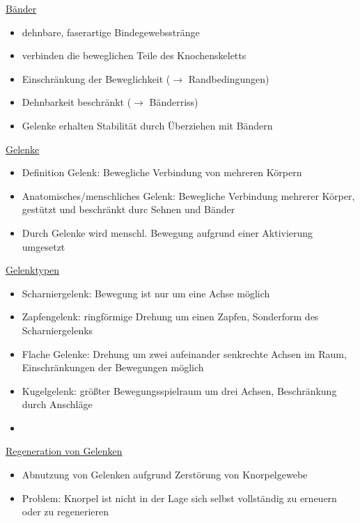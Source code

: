 \documentclass[a4paper,10pt,oneside]{article}
\begin{document}
\underline{Bänder} \\
	\begin{itemize}
		\item dehnbare, faserartige Bindegewebsstränge
		\item verbinden die beweglichen Teile des Knochenskeletts
		\item Einschränkung der Beweglichkeit ($\rightarrow$ Randbedingungen)
		\item Dehnbarkeit beschränkt ($\rightarrow$ Bänderriss)
		\item Gelenke erhalten Stabilität durch Überziehen mit Bändern
	\end{itemize}
 		
\underline{Gelenke} \\
	\begin{itemize}
		\item Definition Gelenk: Bewegliche Verbindung von mehreren Körpern
		\item Anatomisches/menschliches Gelenk: Bewegliche Verbindung mehrerer Körper, gestützt und beschränkt durc Sehnen und Bänder
		\item Durch Gelenke wird menschl. Bewegung aufgrund einer Aktivierung umgesetzt
	\end{itemize}
	
\underline{Gelenktypen} \\
	\begin{itemize}
		\item Scharniergelenk: Bewegung ist nur um eine Achse möglich
		\item Zapfengelenk: ringförmige Drehung um einen Zapfen, Sonderform des Scharniergelenks
		\item Flache Gelenke: Drehung um zwei aufeinander senkrechte Achsen im Raum, Einschränkungen der Bewegungen möglich
		\item Kugelgelenk: größter Bewegungsspielraum um drei Achsen, Beschränkung durch Anschläge
		\item[] %
	\end{itemize}
	

\underline{Regeneration von Gelenken} \\
	\begin{itemize}
		\item Abnutzung von Gelenken aufgrund Zerstörung von Knorpelgewebe
		\item Problem: Knorpel ist nicht in der Lage sich selbst vollständig zu erneuern oder zu regenerieren
	\end{itemize}
	
\end{document}
